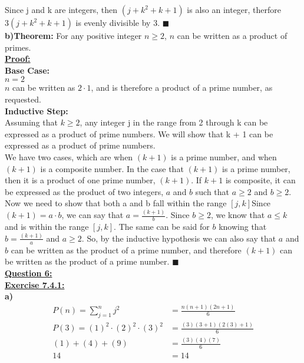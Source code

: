 \documentclass[12pt, letterpaper, twoside]{article}
\begin{document}
\indent Since j and k are integers, then $(j + k^2 + k + 1)$ is also an integer, therfore $3(j + k^2 + k + 1)$ is evenly divisible by 3. $\blacksquare$\\
\newpage\noindent \textbf{b)}\textbf{Theorem:} For any positive integer $n \geq 2$, $n$ can be written as a product of primes.\\
\break
\textbf{\underline{Proof:}}\\
\break
\textbf{Base Case:}\\
$n = 2$\\
$n$ can be written as $2 \cdot 1$, and is therefore a product of a prime number, as requested.\\
\break
\textbf{Inductive Step:}\\
\indent Assuming that $k \geq 2$, any integer j in the range from 2 through k can be expressed as a product of prime numbers. We will show that k + 1 can be expressed as a product of prime numbers.\\
\break
\indent We have two cases, which are when $(k + 1)$ is a prime number, and when $(k + 1)$ is a composite number. In the case that $(k + 1)$ is a prime number, then it is a product of one prime number, $(k + 1)$. If $k+1$ is composite, it can be expressed as the product of two integers, $a$ and $b$ such that $a \geq 2$ and $b \geq 2$.\\
\indent Now we need to show that both a and b fall within the range $[j,k]$Since $(k + 1) = a \cdot b$, we can say that $a = \frac{(k + 1)}{b}$. Since $ b \geq 2$, we know that $a \leq k$ and is within the range $[j, k]$. The same can be said for $b$ knowing that $b = \frac{(k+1)}{a}$ and $a \geq 2$. So, by the inductive hypothesis we can also say that $a$ and $b$ can be written as the product of a prime number, and therefore $(k+1)$ can be written as the product of a prime number. $\blacksquare$\\
\newpage\noindent \textbf{\underline{Question 6:}}\\
\break
\noindent \textbf{\underline{Exercise 7.4.1:}}\\
\break
\textbf{a)}\\
\begin{align*}
P(n) = \sum_{j=1}^{n}j^2 &= \frac{n(n + 1)(2n + 1)}{6}\\
P(3) = (1)^2\cdot(2)^2\cdot(3)^2 &= \frac{(3)(3 + 1)(2(3) + 1)}{6} \\
(1) + (4) + (9) &= \frac{(3)(4)(7)}{6}\\
14 &= 14\\
\end{align*}
\end{document}
